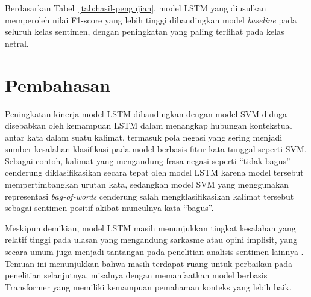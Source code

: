 \begin{table}[htbp]
  \centering
  \caption{Perbandingan kinerja model pada data uji}
  \label{tab:hasil-pengujian}
\end{table}

Berdasarkan Tabel~\ref{tab:hasil-pengujian}, model LSTM yang diusulkan
memperoleh nilai F1-score yang lebih tinggi dibandingkan model
\textit{baseline} pada seluruh kelas sentimen, dengan peningkatan
yang paling terlihat pada kelas netral.

\section{Pembahasan}
Peningkatan kinerja model LSTM dibandingkan dengan model SVM diduga
disebabkan oleh kemampuan LSTM dalam menangkap hubungan kontekstual
antar kata dalam suatu kalimat, termasuk pola negasi yang sering
menjadi sumber kesalahan klasifikasi pada model berbasis fitur kata
tunggal seperti SVM. Sebagai contoh, kalimat yang mengandung frasa
negasi seperti ``tidak bagus'' cenderung diklasifikasikan secara
tepat oleh model LSTM karena model tersebut mempertimbangkan urutan
kata, sedangkan model SVM yang menggunakan representasi
\textit{bag-of-words} cenderung salah mengklasifikasikan kalimat
tersebut sebagai sentimen positif akibat munculnya kata ``bagus''.

Meskipun demikian, model LSTM masih menunjukkan tingkat kesalahan
yang relatif tinggi pada ulasan yang mengandung sarkasme atau opini
implisit, yang secara umum juga menjadi tantangan pada penelitian
analisis sentimen lainnya \citep{example2022}. Temuan ini menunjukkan
bahwa masih terdapat ruang untuk perbaikan pada penelitian
selanjutnya, misalnya dengan memanfaatkan model berbasis Transformer
yang memiliki kemampuan pemahaman konteks yang lebih baik.
